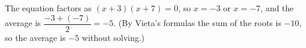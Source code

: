 The equation factors as $(x+3)(x+7)=0$, so $x=-3$ or $x=-7$, and the average is $\dfrac{-3+(-7)}{2}=\boxed{-5}$. (By Vieta's formulas the sum of the roots is $-10$, so the average is $-5$ without solving.)
